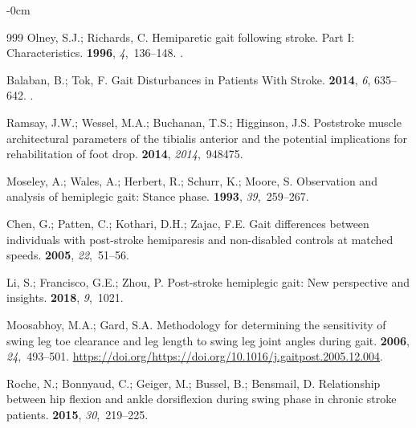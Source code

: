 \documentclass[actuators,article,accept,pdftex,moreauthors]{Definitions/mdpi}
\begin{document}
\begin{adjustwidth}{-\extralength}{0cm}
\begin{thebibliography}{999}
Olney, S.J.; Richards, C.
\newblock Hemiparetic gait following stroke. Part I: Characteristics.
 {\bf 1996}, {\em 4},~136--148.
.

Balaban, B.; Tok, F.
\newblock Gait Disturbances in Patients With Stroke.
  {\bf 2014}, {\em 6}, {635--642.} %
.

Ramsay, J.W.; Wessel, M.A.; Buchanan, T.S.; Higginson, J.S.
\newblock Poststroke muscle architectural parameters of the tibialis anterior
  and the potential implications for rehabilitation of foot drop.
 {\bf 2014}, {\em 2014},~948475.

Moseley, A.; Wales, A.; Herbert, R.; Schurr, K.; Moore, S.
\newblock Observation and analysis of hemiplegic gait: Stance phase.
 {\bf 1993}, {\em
  39},~259--267.

Chen, G.; Patten, C.; Kothari, D.H.; Zajac, F.E.
\newblock Gait differences between individuals with post-stroke hemiparesis and
  non-disabled controls at matched speeds.
 {\bf 2005}, {\em 22},~51--56.

Li, S.; Francisco, G.E.; Zhou, P.
\newblock Post-stroke hemiplegic gait: New perspective and insights.
 {\bf 2018}, {\em 9},~1021.

Moosabhoy, M.A.; Gard, S.A.
\newblock Methodology for determining the sensitivity of swing leg toe
  clearance and leg length to swing leg joint angles during gait.
 {\bf 2006}, {\em 24},~493--501.
\newblock
  {\url{https://doi.org/https://doi.org/10.1016/j.gaitpost.2005.12.004}}.

Roche, N.; Bonnyaud, C.; Geiger, M.; Bussel, B.; Bensmail, D.
\newblock Relationship between hip flexion and ankle dorsiflexion during swing
  phase in chronic stroke patients.
 {\bf 2015}, {\em 30},~219--225.


\end{thebibliography}
\end{adjustwidth}
\end{document}
